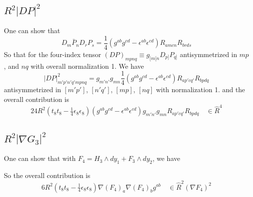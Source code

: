 



\subsection{$R^2|DP|^2$}
One can show that 
\begin{equation}
D_m\bar{P}_n D_r P_s = \frac{1}{4}(g^{ab}g^{cd} - \epsilon^{ab}\epsilon^{cd})R_{amcn}R_{brds}
\end{equation}
So that for the four-index tensor $(DP)_{mpnq} \equiv g_{[m[n} D_{p]} P_{q]}$ antisymmetrized in $mp$, and $nq$ with overall normalization 1. 
We have
\begin{equation}
|DP|^2_{m'p'n'q' mpnq} = g_{m'n'}g_{mn} \frac{1}{4}(g^{ab}g^{cd} - \epsilon^{ab}\epsilon^{cd})R_{a p' c q'}R_{b p d q}
\end{equation}
antisymmetrized in $[m'p']$, $[n'q']$, $[mp]$, $[nq]$ with normalization 1.
and the overall contribution is
\begin{equation}
24R^2 (t_8t_8-\tfrac14\epsilon_8\epsilon_8)(g^{ab}g^{cd} - \epsilon^{ab}\epsilon^{cd}) g_{m'n'}g_{mn}R_{a p' c q'}R_{b p d q}
\quad \in \hat{R}^4
\end{equation}

\subsection{$R^2|\nabla G_3|^2$}
One can show that with $F_4 = H_3 \wedge dy_1 + F_3 \wedge dy_2$, we have

So the overall contribution is
\begin{equation}
6 R^2(t_8t_8 - \tfrac14 \epsilon_8\epsilon_8)  \nabla (F_4)_a \nabla (F_4)_b g^{ab}
\quad \in \hat{R}^2 (\nabla F_4)^2
\end{equation}

